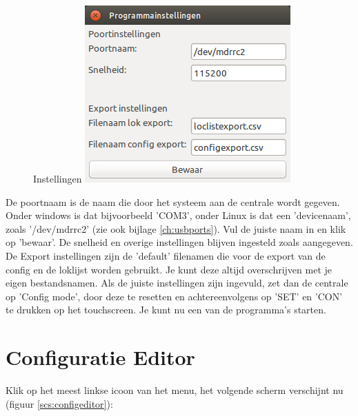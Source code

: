 \documentclass[12pt,a4paper]{report}
\begin{document}
\begin{figure}[ht]
  \captionbox
  {Instellingen\label{scs:settings}}
  {\includegraphics[scale=0.5]{images/rcu_screenshot2}\\}
\end{figure}

De poortnaam is de naam die door het systeem aan de centrale wordt gegeven. Onder windows is dat bijvoorbeeld 'COM3', onder Linux is dat een 'devicenaam', zoals '/dev/mdrrc2' (zie ook bijlage \ref{ch:usbports}). Vul de juiste naam in en klik op 'bewaar'. De snelheid en overige instellingen blijven ingesteld zoals aangegeven.
De Export instellingen zijn de 'default' filenamen die voor de export van de config en de loklijst worden gebruikt. Je kunt deze altijd overschrijven met je eigen bestandsnamen.
Als de juiste instellingen zijn ingevuld, zet dan de centrale op 'Config mode', door deze te resetten en achtereenvolgens op 'SET' en 'CON' te drukken op het touchscreen.
Je kunt nu een van de programma's starten.

\section{Configuratie Editor}
Klik op het meest linkse icoon van het menu, het volgende scherm verschijnt nu (figuur \ref{scs:configeditor}):\\
\end{document}
